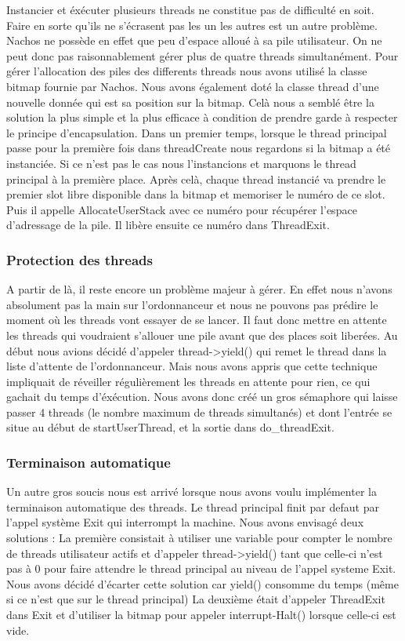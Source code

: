 \documentclass[12pt]{article}
\begin{document}
Instancier et éxécuter plusieurs threads ne constitue pas de difficulté en soit.
Faire en sorte qu'ils ne s'écrasent pas les un les autres est un autre problème.
Nachos ne possède en effet que peu d'espace alloué à sa pile utilisateur.
On ne peut donc pas raisonnablement gérer plus de quatre threads simultanément.
Pour gérer l'allocation des piles des differents threads nous avons utilisé la classe
bitmap fournie par Nachos. Nous avons également doté la classe thread d'une nouvelle donnée
qui est sa position sur la bitmap. Celà nous a semblé être la solution la plus simple et
la plus efficace à condition de prendre garde à respecter le principe d'encapsulation.
Dans un premier temps, lorsque le thread principal passe pour la première fois dans threadCreate
nous regardons si la bitmap a été instanciée. Si ce n'est pas le cas nous l'instancions
et marquons le thread principal à la première place.
Après celà, chaque thread instancié va prendre le premier slot libre disponible dans
la bitmap et memoriser le numéro de ce slot. Puis il appelle AllocateUserStack avec ce
numéro pour récupérer l'espace d'adressage de la pile.
Il libère ensuite ce numéro dans ThreadExit.

\subsubsection{Protection des threads}

A partir de là, il reste encore un problème majeur à gérer. En effet nous n'avons absolument
pas la main sur l'ordonnanceur et nous ne pouvons pas prédire le moment où les threads
vont essayer de se lancer. Il faut donc mettre en attente les threads qui voudraient
s'allouer une pile avant que des places soit liberées. Au début nous avions décidé
d'appeler thread->yield() qui remet le thread dans la liste d'attente de l'ordonnanceur.
Mais nous avons appris que cette technique impliquait de réveiller régulièrement les
threads en attente pour rien, ce qui gachait du temps d'éxécution.
Nous avons donc créé un gros sémaphore qui laisse passer 4 threads (le nombre maximum de threads
simultanés) et dont l'entrée se situe au début de startUserThread, et la sortie dans do\_threadExit.

\subsubsection{Terminaison automatique}
Un autre gros soucis nous est arrivé lorsque nous avons voulu implémenter la terminaison
automatique des threads. Le thread principal finit par defaut par l'appel système Exit
qui interrompt la machine.
Nous avons envisagé deux solutions :
La première consistait à utiliser une variable pour compter le nombre de threads utilisateur actifs
et d'appeler thread->yield() tant que celle-ci n'est pas à 0 pour faire attendre le thread principal
au niveau de l'appel systeme Exit. Nous avons décidé d'écarter cette solution car yield()
consomme du temps (même si ce n'est que sur le thread principal)
La deuxième était d'appeler ThreadExit dans Exit et d'utiliser la bitmap pour appeler interrupt-Halt()
lorsque celle-ci est vide.
\end{document}
